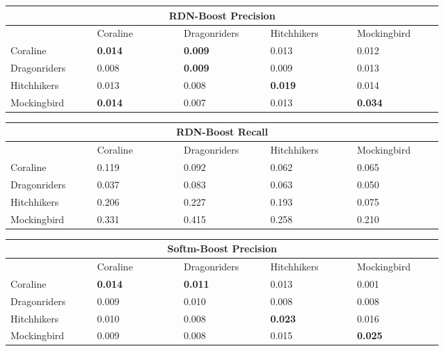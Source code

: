 \documentclass[letterpaper]{article}
\begin{document}
\begin{table}[ht]
\centering

\begin{tabular}{|p{0.15\linewidth}|p{0.15\linewidth}|p{0.15\linewidth}|p{0.15\linewidth}|p{0.15\linewidth}|}
        \hline
        \multicolumn{5}{|c|}{RDN-Boost Precision}\\
        \hline
            & Coraline & Dragonriders & Hitchhikers & Mockingbird \\
            \hline
             Coraline & \textbf{0.014} & \textbf{0.009} & 0.013 & 0.012 \\
             Dragonriders & 0.008 & \textbf{0.009} & 0.009 & 0.013 \\
             Hitchhikers & 0.013 & 0.008 & \textbf{0.019} & 0.014 \\
             Mockingbird & \textbf{0.014} & 0.007 & 0.013 & \textbf{0.034} \\
        \hline
        \end{tabular}
        
        \begin{tabular}{|p{0.15\linewidth}|p{0.15\linewidth}|p{0.15\linewidth}|p{0.15\linewidth}|p{0.15\linewidth}|}
        \hline
        \multicolumn{5}{|c|}{RDN-Boost Recall}\\
        \hline
            & Coraline & Dragonriders & Hitchhikers & Mockingbird\\
            \hline
            Coraline & 0.119 & 0.092 & 0.062 & 0.065 \\
            Dragonriders & 0.037 & 0.083 & 0.063 & 0.050 \\
            Hitchhikers & 0.206 & 0.227 & 0.193 & 0.075 \\
            Mockingbird & 0.331 & 0.415 & 0.258 & 0.210 \\
        \hline
        \end{tabular}
        
        \begin{tabular}{|p{0.15\linewidth}|p{0.15\linewidth}|p{0.15\linewidth}|p{0.15\linewidth}|p{0.15\linewidth}|}
        \hline
        \multicolumn{5}{|c|}{Softm-Boost Precision}\\
        \hline
            & Coraline & Dragonriders & Hitchhikers & Mockingbird \\
            \hline
             Coraline & \textbf{0.014} & \textbf{0.011} & 0.013 & 0.001 \\
             Dragonriders & 0.009 & 0.010 & 0.008 & 0.008 \\
             Hitchhikers & 0.010 & 0.008 & \textbf{0.023} & 0.016 \\
             Mockingbird & 0.009 & 0.008 & 0.015 & \textbf{0.025} \\
        \hline
        \end{tabular}
        

\end{table}
\end{document}
